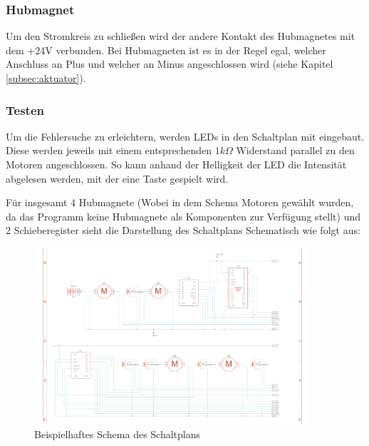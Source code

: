 \subsubsection{Hubmagnet}

Um den Stromkreis zu schließen wird der andere Kontakt des Hubmagnetes mit dem +24V verbunden.
Bei Hubmagneten ist es in der Regel egal, welcher Anschluss an Plus und welcher an Minus angeschlossen wird
(siehe Kapitel \ref{subsec:aktuator}).

\subsubsection{Testen}

Um die Fehlersuche zu erleichtern, werden LEDs in den Schaltplan mit eingebaut.
Diese werden jeweils mit einem entsprechenden $1k\Omega$ Widerstand parallel zu den Motoren angeschlossen.
So kann anhand der Helligkeit der LED die Intensität abgelesen werden, mit der eine Taste gespielt wird.
\newline

Für insgesamt 4 Hubmagnete (Wobei in dem Schema Motoren gewählt wurden, da das Programm keine Hubmagnete als Komponenten
zur Verfügung stellt) und 2 Schieberegister sieht die Darstellung des Schaltplans Schematisch wie folgt aus:

\begin{figure}[htbp]
	\centering
	\includegraphics[width=0.9\textwidth]{img/SchematischeSchaltungExp}
	\caption{Beispielhaftes Schema des Schaltplans}
	\label{img:SchaltungExpSchema}
\end{figure}


